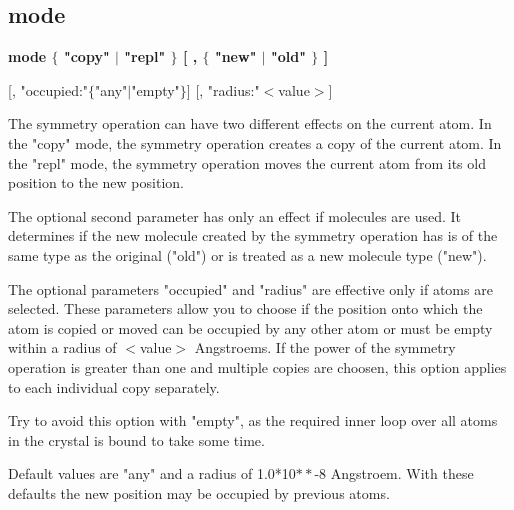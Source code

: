 \subsection*{mode}
{\bf mode $ \{$ "copy" $| $ "repl" $\} $ [ , $ \{$ "new" $| $ "old" $\} $ ] \par }
\vspace{3pt}
     [, "occupied:"$ \{$"any"$| $"empty"$\} $] 
     [, "radius:"$ <$value$> $] 
\par
The symmetry operation can have two different effects on the current 
atom. In the "copy" mode, the symmetry operation creates a copy of the 
current atom. In the "repl" mode, the symmetry operation moves the 
current atom from its old position to the new position. 
\par
The optional second parameter has only an effect if molecules are 
used. It determines if the new molecule created by the symmetry 
operation has is of the same type as the original ("old") or is 
treated as a new molecule type ("new"). 
\par
The optional parameters "occupied" and "radius" are effective 
only if atoms are selected. These parameters allow you to 
choose if the position onto which the atom is copied or moved 
can be occupied by any other atom or must be empty within a 
radius of $ <$value$> $ Angstroems. If the power of the symmetry 
operation is greater than one and multiple copies are choosen, this 
option applies to each individual copy separately. 
\par
Try to avoid this option with "empty", as the required inner 
loop over all atoms in the crystal is bound to take some time. 
\par
Default values are "any" and a radius of 1.0*10$**$-8 Angstroem. 
With these defaults the new position may be occupied by 
previous atoms. 
